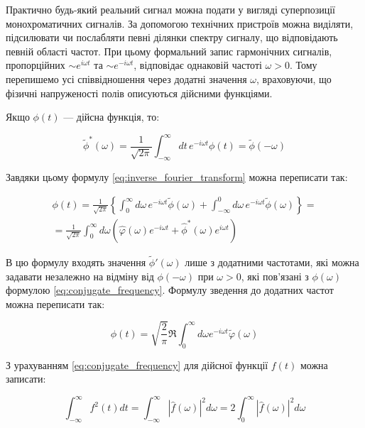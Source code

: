 Практично будь-який реальний сигнал можна подати у вигляді суперпозиції монохроматичних сигналів. За допомогою технічних пристроїв можна виділяти,
підсилювати чи послабляти певні ділянки спектру сигналу, що відповідають певній області частот. При цьому формальний запис гармонічних сигналів,
пропорційних $\sim e^{i\omega t}$ та $\sim e^{-i\omega t}$, відповідає однаковій частоті $\omega > 0$. Тому перепишемо усі співвідношення через додатні
значення $\omega$, враховуючи, що фізичні напруженості полів описуються дійсними функціями.

Якщо $\phi(t)$ --- дійсна функція, то:

\begin{equation}\label{eq:conjugate_frequency}
\tilde{\phi}^{*}(\omega) = \frac{1}{\sqrt{2\pi}} \int_{-\infty}^{\infty} dt \, e^{-i\omega t} \phi(t) = \tilde{\phi}(-\omega)
\end{equation}

Завдяки цьому формулу \eqref{eq:inverse_fourier_transform} можна переписати так:

\begin{multline*}
\phi(t) = \frac{1}{\sqrt{2\pi}} \left\{ \int_{0}^{\infty} d\omega \, e^{-i\omega t} \tilde{\phi}(\omega) + \int_{-\infty}^{0} d\omega \, e^{-i\omega t}
\tilde{\phi}(\omega) \right\} = \\
= \frac{1}{\sqrt{2\pi}} \int_{0}^{\infty} d\omega \left( \hat{\varphi}(\omega) e^{-i\omega t} + \hat{\phi}^{*}(\omega) e^{i\omega t} \right)
\end{multline*}

В цю формулу входять значення \( \tilde{\phi}'(\omega) \) лише з додатними частотами, які можна задавати незалежно на відміну від \( \phi(-\omega) \)
при \(
\omega > 0 \), які пов’язані з \( \phi(\omega) \) формулою \eqref{eq:conjugate_frequency}. Формулу зведення до додатних частот можна переписати так:

\begin{equation}
\phi(t) = \sqrt{\frac{2}{\pi}} \Re \int_{0}^{\infty} d\omega e^{-i\omega t} \tilde{\varphi}(\omega)
\label{eq:positive_frequencies}
\end{equation}

З урахуванням \eqref{eq:conjugate_frequency} для дійсної функції \( f(t) \) можна записати:

\begin{equation}
\int_{-\infty}^{\infty} f^2(t) dt = \int_{-\infty}^{\infty} |\hat{f}(\omega)|^2 d\omega = 2\int_{0}^{\infty} |\hat{f}(\omega)|^2 d\omega
\label{eq:energy_relation}
\end{equation}

